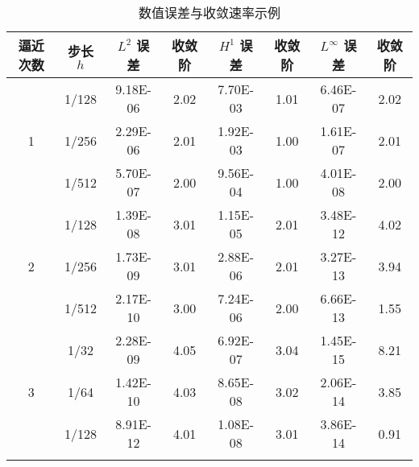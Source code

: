 \begin{table}[htp!]
\centering
\caption{数值误差与收敛速率示例}
\label{tab:error}
\begin{tabular}{c|c|cc|cc|cc}
\Xhline{2\arrayrulewidth}
逼近次数 & 步长 $h$ & $L^2$ 误差 & 收敛阶 & $H^1$ 误差 & 收敛阶 & $L^\infty$ 误差 & 收敛阶 \\
\hline
  & 1/128 & 9.18E-06 & 2.02 & 7.70E-03 & 1.01  & 6.46E-07 & 2.02 \\
1 & 1/256 & 2.29E-06 & 2.01 & 1.92E-03 & 1.00  & 1.61E-07 & 2.01 \\
  & 1/512 & 5.70E-07 & 2.00 & 9.56E-04 & 1.00  & 4.01E-08 & 2.00 \\
\hline
  & 1/128 & 1.39E-08 & 3.01 & 1.15E-05 & 2.01  & 3.48E-12 & 4.02 \\
2 & 1/256 & 1.73E-09 & 3.01 & 2.88E-06 & 2.01  & 3.27E-13 & 3.94 \\
  & 1/512 & 2.17E-10 & 3.00 & 7.24E-06 & 2.00  & 6.66E-13 & 1.55 \\
\hline
  & 1/32  & 2.28E-09 & 4.05 & 6.92E-07 & 3.04  & 1.45E-15 & 8.21 \\
3 & 1/64  & 1.42E-10 & 4.03 & 8.65E-08 & 3.02  & 2.06E-14 & 3.85 \\
  & 1/128 & 8.91E-12 & 4.01 & 1.08E-08 & 3.01  & 3.86E-14 & 0.91 \\
\Xhline{2\arrayrulewidth}
\end{tabular}
\end{table}

